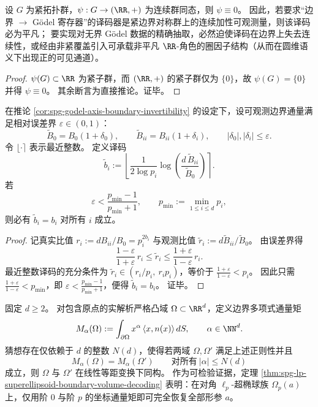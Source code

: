 \begin{theorem}[紧边界连续加性译码的平凡性]\label{thm:spg-compact-boundary-continuous-decoder-trivial}
设 \(G\) 为紧拓扑群，\(\psi:G\to(\RR,+)\) 为连续群同态，则 \(\psi\equiv 0\)。
因此，若要求“边界 \(\to\) Gödel 寄存器”的译码器是紧边界对称群上的连续加性可观测量，则该译码必为平凡；
要实现对无界 Gödel 数据的精确抽取，必然迫使译码在边界上失去连续性，或经由非紧覆盖引入可承载非平凡 \(\RR\)-角色的圈因子结构（从而在圆维语义下出现正的可见通道）。
\end{theorem}
\begin{proof}
\(\psi(G)\subset\RR\) 为紧子群，而 \((\RR,+)\) 的紧子群仅为 \(\{0\}\)，故 \(\psi(G)=\{0\}\) 并得 \(\psi\equiv 0\)。
其余断言为直接推论。证毕。
\end{proof}

\begin{theorem}\label{thm:spg-godel-boundary-decoding-relative-error-threshold}
在推论 \ref{cor:spg-godel-axis-boundary-invertibility} 的设定下，设可观测边界通量满足相对误差界 \(\varepsilon\in(0,1)\)：
\[
\widetilde B_0=B_0(1+\delta_0),
\qquad
\widetilde B_{ii}=B_{ii}(1+\delta_i),
\qquad
|\delta_0|,|\delta_i|\le \varepsilon.
\]
令 \(\lfloor \cdot\rceil\) 表示最近整数。
定义译码
\[
\widetilde b_i:=\left\lfloor \frac{1}{2\log p_i}\log\!\left(\frac{d\,\widetilde B_{ii}}{\widetilde B_0}\right)\right\rceil.
\]
若
\[
\varepsilon<\frac{p_{\min}-1}{p_{\min}+1},
\qquad
p_{\min}:=\min_{1\le i\le d}p_i,
\]
则必有 \(\widetilde b_i=b_i\) 对所有 \(i\) 成立。
\end{theorem}
\begin{proof}
记真实比值 \(r_i:=dB_{ii}/B_0=p_i^{2b_i}\) 与观测比值 \(\widetilde r_i:=d\widetilde B_{ii}/\widetilde B_0\)。
由误差界得
\[
\frac{1-\varepsilon}{1+\varepsilon}\,r_i
\le
\widetilde r_i
\le
\frac{1+\varepsilon}{1-\varepsilon}\,r_i.
\]
最近整数译码的充分条件为 \(\widetilde r_i\in(r_i/p_i,\ r_ip_i)\)，等价于
\(
\frac{1+\varepsilon}{1-\varepsilon}<p_i
\)。
因此只需 \(\frac{1+\varepsilon}{1-\varepsilon}<p_{\min}\)，即 \(\varepsilon<\frac{p_{\min}-1}{p_{\min}+1}\)，便得 \(\widetilde b_i=b_i\)。
证毕。
\end{proof}





\begin{conjecture}[边界多项式通量的有限阶全息完备性]\label{conj:spg-boundary-polynomial-flux-finite-order-completeness}
固定 \(d\ge 2\)。
对包含原点的实解析严格凸域 \(\Omega\subset\RR^d\)，定义边界多项式通量矩
\[
M_\alpha(\Omega):=\int_{\partial\Omega} x^\alpha\,\langle x,n(x)\rangle\,dS,
\qquad \alpha\in\NN^d.
\]
猜想存在仅依赖于 \(d\) 的整数 \(N(d)\)，使得若两域 \(\Omega,\Omega'\) 满足上述正则性并且
\[
M_\alpha(\Omega)=M_\alpha(\Omega')\qquad\text{对所有}\ |\alpha|\le N(d)
\]
成立，则 \(\Omega\) 与 \(\Omega'\) 在线性等距变换下同构。
作为可检验证据，定理 \ref{thm:spg-lp-superellipsoid-boundary-volume-decoding} 表明：在对角 \(\ell_p\)-超椭球族 \(\Omega_p(a)\) 上，仅用阶 \(0\) 与阶 \(p\) 的坐标通量矩即可完全恢复全部形参 \(a\)。
\end{conjecture}

\endinput

